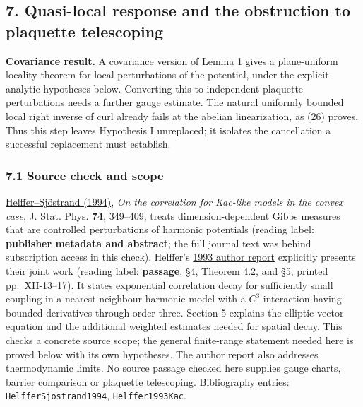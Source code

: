 \documentclass[11pt,a4paper]{article}
\begin{document}
\hypertarget{quasi-local-response-and-the-obstruction-to-plaquette-telescoping}{%
\subsection{7. Quasi-local response and the obstruction to plaquette
telescoping}\label{quasi-local-response-and-the-obstruction-to-plaquette-telescoping}}

\textbf{Covariance result.} A covariance version of Lemma 1 gives a
plane-uniform locality theorem for local perturbations of the potential,
under the explicit analytic hypotheses below. Converting this to
independent plaquette perturbations needs a further gauge estimate. The
natural uniformly bounded local right inverse of curl already fails at
the abelian linearization, as (26) proves. Thus this step leaves
Hypothesis I unreplaced; it isolates the cancellation a successful
replacement must establish.

\hypertarget{source-check-and-scope}{%
\subsubsection{7.1 Source check and
scope}\label{source-check-and-scope}}

\href{https://doi.org/10.1007/BF02186817}{Helffer--Sjöstrand (1994)},
\emph{On the correlation for Kac-like models in the convex case}, J.
Stat. Phys. \textbf{74}, 349--409, treats dimension-dependent Gibbs
measures that are controlled perturbations of harmonic potentials
(reading label: \textbf{publisher metadata and abstract}; the full
journal text was behind subscription access in this check). Helffer's
\href{https://www.numdam.org/item/SEDP_1992-1993____A12_0/}{1993 author
report} explicitly presents their joint work (reading label:
\textbf{passage}, §4, Theorem 4.2, and §5, printed pp.~XII-13--17). It
states exponential correlation decay for sufficiently small coupling in
a nearest-neighbour harmonic model with a \(C^3\) interaction having
bounded derivatives through order three. Section 5 explains the elliptic
vector equation and the additional weighted estimates needed for spatial
decay. This checks a concrete source scope; the general finite-range
statement needed here is proved below with its own hypotheses. The
author report also addresses thermodynamic limits. No source passage
checked here supplies gauge charts, barrier comparison or plaquette
telescoping. Bibliography entries: \texttt{HelfferSjostrand1994},
\texttt{Helffer1993Kac}.
\end{document}
